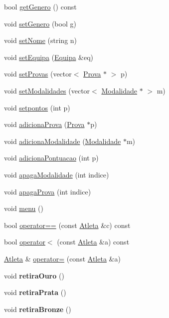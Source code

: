 \begin{DoxyCompactItemize}
\item 
bool \hyperlink{class_atleta_a85f10fa37fcc45860745893c95dc0b34}{get\+Genero} () const 
\item 
void \hyperlink{class_atleta_a8556e86a2cae3eeafb3d97e6c283241f}{set\+Genero} (bool g)
\item 
void \hyperlink{class_atleta_a35fcdb190f9b6b5100fba23cc98e5304}{set\+Nome} (string n)
\item 
void \hyperlink{class_atleta_a410bd5f21959b99444ed4c0f736cdacc}{set\+Equipa} (\hyperlink{class_equipa}{Equipa} \&eq)
\item 
void \hyperlink{class_atleta_ae70dd68db249f3828ee53c15df67a201}{set\+Provas} (vector$<$ \hyperlink{class_prova}{Prova} $\ast$ $>$ p)
\item 
void \hyperlink{class_atleta_adbaffac5f1bf0eedf090cb0a91734bd5}{set\+Modalidades} (vector$<$ \hyperlink{class_modalidade}{Modalidade} $\ast$ $>$ m)
\item 
void \hyperlink{class_atleta_a9af09149a6b3c22ca514154b4a29b7f3}{setpontos} (int p)
\item 
void \hyperlink{class_atleta_a7a4bee73158d8ee13b4812eb96decb61}{adiciona\+Prova} (\hyperlink{class_prova}{Prova} $\ast$p)
\item 
void \hyperlink{class_atleta_a036b7b9cdf087a63e601b4e3a9f5552f}{adiciona\+Modalidade} (\hyperlink{class_modalidade}{Modalidade} $\ast$m)
\item 
void \hyperlink{class_atleta_af143bde354ddd015eeaaf7ea819887fd}{adiciona\+Pontuacao} (int p)
\item 
void \hyperlink{class_atleta_a72dcf8a7a26d47eb5f39e876cb9537bd}{apaga\+Modalidade} (int indice)
\item 
void \hyperlink{class_atleta_aeefa19a643057d8688448aeafadc3dcb}{apaga\+Prova} (int indice)
\item 
void \hyperlink{class_atleta_a24b4c70d5e08a875612c8e234fa4ab44}{menu} ()
\item 
bool \hyperlink{class_atleta_a2c2de5e4a0f9963dd9c1a6507b593aed}{operator==} (const \hyperlink{class_atleta}{Atleta} \&c) const 
\item 
bool \hyperlink{class_atleta_a86b4c8fda3582aab61d9796bc5bdced3}{operator$<$} (const \hyperlink{class_atleta}{Atleta} \&a) const 
\item 
\hyperlink{class_atleta}{Atleta} \& \hyperlink{class_atleta_aea00de3983e444705d4f06702b344413}{operator=} (const \hyperlink{class_atleta}{Atleta} \&a)
\item 
\hypertarget{class_atleta_a91337282f8fb07a12d30750847f8d216}{}void {\bfseries retira\+Ouro} ()\label{class_atleta_a91337282f8fb07a12d30750847f8d216}

\item 
\hypertarget{class_atleta_ab2ff243098be1809689a8cba7a15cbe6}{}void {\bfseries retira\+Prata} ()\label{class_atleta_ab2ff243098be1809689a8cba7a15cbe6}

\item 
\hypertarget{class_atleta_a2c1d76a5fb0ed20daa7534b1c2e41ef0}{}void {\bfseries retira\+Bronze} ()\label{class_atleta_a2c1d76a5fb0ed20daa7534b1c2e41ef0}

\end{DoxyCompactItemize}
